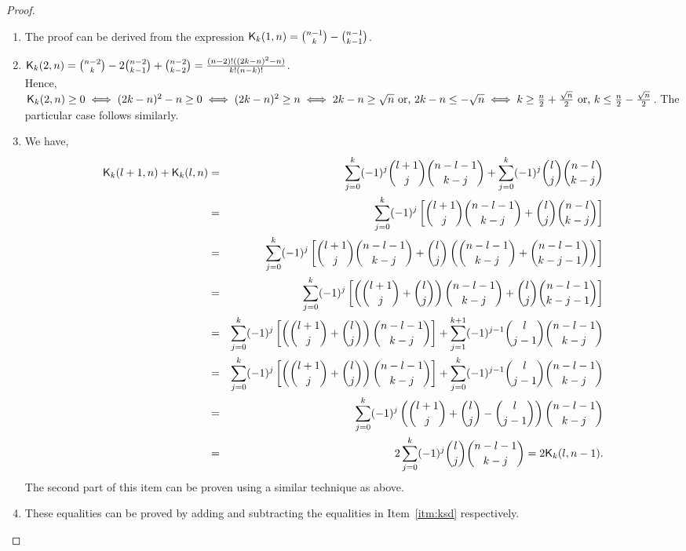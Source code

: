 \documentclass{llncs}
\begin{document}
\begin{proof}
\begin{enumerate}
\item The proof can be derived from the expression $\mathsf{K}_{k}(1,n) = {n-1 \choose k} - {n-1 \choose k-1}$.
\item $\mathsf{K}_{k}(2,n) = {n-2 \choose k} - 2{n-2 \choose k-1} + {n-2 \choose k-2} = \frac{(n-2)!((2k-n)^2-n)}{k!(n-k)!}$.\\
Hence, $\mathsf{K}_{k}(2,n) \geq 0 \iff (2k-n)^2-n \geq 0 \iff (2k-n)^2 \geq n \iff 2k-n \geq \sqrt{n} \text{ or, } 2k-n \leq -\sqrt{n} \iff k \geq \frac{n}{2}+\frac{\sqrt{n}}{2} \text{ or, } k \leq \frac{n}{2}-\frac{\sqrt{n}}{2}$.
The particular case follows similarly.
\item We have,
\begin{eqnarray*}
 \kraw{k}{l+1}{n} + \kraw{k}{l}{n} & = & \sum_{j=0}^k (-1)^j{l+1 \choose j} {n-l-1 \choose k-j} + \sum_{j=0}^k(-1)^j{l \choose j} {n-l \choose k-j} \\
% 
 & = & \sum_{j=0}^k(-1)^j\left[{l+1 \choose j} {n-l-1 \choose k-j} + {l \choose j} {n-l \choose k-j}\right] \\
% 
 & = & \sum_{j=0}^k(-1)^j\left[{l+1 \choose j} {n-l-1 \choose k-j} + {l \choose j} \left({n-l-1 \choose k-j} + {n-l-1 \choose k-j-1}\right)\right] \\ 
 & = & \sum_{j=0}^k(-1)^j\left[\left({l+1 \choose j} + {l \choose j}\right){n-l-1 \choose k-j} + {l \choose j} {n-l-1 \choose k-j-1}\right]\\
  & = & \sum_{j=0}^k(-1)^j\left[\left({l+1 \choose j} + {l \choose j}\right){n-l-1 \choose k-j} \right]
  + \sum_{j=1}^{k+1}(-1)^{j-1}{l \choose j-1} {n-l-1 \choose k-j}\\
 & = & \sum_{j=0}^k(-1)^j\left[\left({l+1 \choose j} + {l \choose j}\right){n-l-1 \choose k-j}  \right]+ \sum_{j=0}^k(-1)^{j-1}{l \choose j-1} {n-l-1 \choose k-j}\\
 & = & \sum_{j=0}^k(-1)^j\left({l+1 \choose j} + {l \choose j}-{l \choose j-1}\right){n-l-1 \choose k-j}\\
 & = & 2\sum_{j=0}^k(-1)^j {l \choose j}{n-l-1 \choose k-j} = 2\kraw{k}{l}{n-1}.
\end{eqnarray*}
The second part of this item can be proven using a similar technique as above.
\item These equalities can be proved by adding and subtracting the equalities in Item~\ref{itm:ksd} respectively.
\end{enumerate}
\end{proof}
\end{document}
